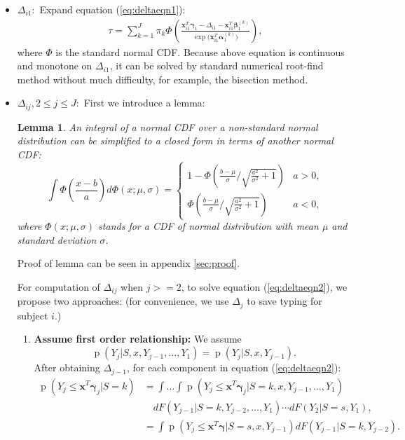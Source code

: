 \documentclass[12pt]{article}
\newtheorem{lem}[thm]{Lemma}
\DeclareMathOperator{\pr}{p}
\begin{document}
\begin{itemize}
\item \textbf{$\Delta_{i1}: $} Expand equation (\ref{eq:deltaeqn1}):
  \begin{align*}
    \tau = \sum_{k = 1}^J \pi_k \Phi \left( \frac{\bm x_{i1}^T \bm
        \gamma_1 - \Delta_{i1} - \bm x_{i1}^T\bm \beta_1^{(k)}}{\exp
        \big( \bm x_{i1}^T \bm \alpha_1^{(k)} \big)} \right),
  \end{align*}
  where $\Phi$ is the standard normal CDF. Because above equation is
  continuous and monotone on $\Delta_{i1}$, it can be solved by
  standard numerical root-find method without much difficulty, for
  example, the bisection method.

\item \textbf{$\Delta_{ij}, 2\leq j \leq J: $} First we introduce a
  lemma:
  \begin{lem}\label{sec:lemma}
    An integral of a normal CDF over a non-standard normal
    distribution can be simplified to a closed form in terms of
    another normal CDF:
    \begin{equation}
      \label{eq:lem}
      \int \Phi \left( \frac{x-b}{a} \right) d\Phi(x; \mu, \sigma)  = 
      \begin{cases}
        1- \Phi \left( \frac{b-\mu}{\sigma} \big / \sqrt{\frac{a^2}{\sigma^2}+1} \right) & a > 0, \\
        \Phi \left( \frac{b-\mu}{\sigma} \big /
          \sqrt{\frac{a^2}{\sigma^2}+1} \right) & a < 0 ,
      \end{cases}
    \end{equation}
    where $\Phi(x; \mu, \sigma)$ stands for a CDF of normal
    distribution with mean $\mu$ and standard deviation $\sigma$.
  \end{lem}
  Proof of lemma can be seen in appendix \ref{sec:proof}.

  For computation of $\Delta_{ij}$ when $j >= 2$, to solve equation
  (\ref{eq:deltaeqn2}), we propose two approaches: (for convenience,
  we use $\Delta_j$ to save typing for subject $i$.)

  \begin{enumerate}
  \item \textbf{Assume first order relationship:} We assume
    \begin{equation*}
      \pr (Y_j|S, x, Y_{j-1}, \ldots, Y_1) = \pr (Y_j|S, x, Y_{j-1}).
    \end{equation*}
    After obtaining $\Delta_{j-1}$, for each component in equation
    (\ref{eq:deltaeqn2}):
    \begin{align*}
      \pr (Y_j \leq  \bm x^T \bm \gamma_j | S = k) & =  \int\dots\int 
\pr (Y_j \leq \bm x^T\bm \gamma_j | S=k, x, Y_{j-1}, \ldots, Y_1)\\
& \quad  dF(Y_{j-1}|S=k, Y_{j-2}, \ldots, Y_1)\cdots dF(Y_2|S=s, Y_1),\\
      & = \int \pr (Y_j \leq \bm x^T \bm \gamma | S=s, x, Y_{j-1})
      dF(Y_{j-1}|S=k, Y_{j-2}).
    \end{align*}


\end{enumerate}
\end{itemize}
\end{document}
